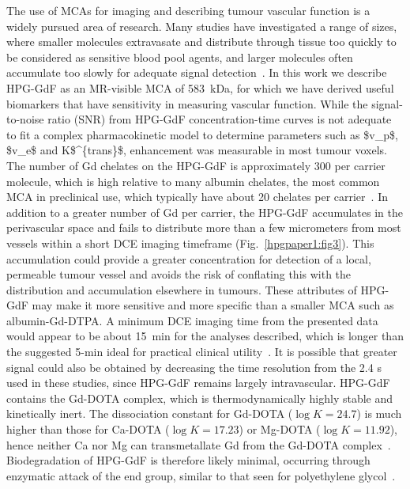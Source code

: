 The use of \acs{MCA}s for imaging and describing tumour vascular function is a widely pursued area of research.
Many studies have investigated a range of sizes, where smaller molecules extravasate and distribute through tissue too quickly to be considered as sensitive blood pool agents, and larger molecules often accumulate too slowly for adequate signal detection~\cite{Kyle:2007ch,Tang:2013fi,Sourbron:2011ce}.
In this work we describe \acs{HPG-GdF} as an MR-visible \acs{MCA} of 583~\acs{kDa}, for which we have derived useful biomarkers that have sensitivity in measuring vascular function.
While the signal-to-noise ratio (\acs{SNR}) from \acs{HPG-GdF} concentration-time curves is not adequate to fit a complex pharmacokinetic model to determine parameters such as \acs{$v_p$}, \acs{$v_e$} and \acs{K$^{trans}$}, enhancement was measurable in most tumour voxels.
The number of Gd chelates on the \acs{HPG-GdF} is approximately 300 per carrier molecule, which is high relative to many albumin chelates, the most common \acs{MCA} in preclinical use, which typically have about 20 chelates per carrier~\cite{Ogan:1987tg}.
In addition to a greater number of Gd per carrier, the \acs{HPG-GdF} accumulates in the perivascular space and fails to distribute more than a few micrometers from most vessels within a short DCE imaging timeframe (Fig.~\ref{hpgpaper1:fig3}).
This accumulation could provide a greater concentration for detection of a local, permeable tumour vessel and avoids the risk of conflating this with the distribution and accumulation elsewhere in tumours.
These attributes of \acs{HPG-GdF} may make it more sensitive and more specific than a smaller  \acs{MCA} such as albumin-Gd-DTPA.
A minimum DCE imaging time from the presented data would appear to be about 15~min for the analyses described, which is longer than the suggested 5-min ideal for practical clinical utility~\cite{Turetschek:2004bw}.
It is possible that greater signal could also be obtained by decreasing the time resolution from the 2.4 s used in these studies, since \acs{HPG-GdF} remains largely intravascular.
\acs{HPG-GdF} contains the Gd-\acs{DOTA} complex, which is thermodynamically highly  stable and kinetically inert.
The dissociation constant for Gd-\acs{DOTA} ($\log K = 24.7$) is much higher than those for Ca-\acs{DOTA} ($\log K = 17.23$) or Mg-\acs{DOTA} ($\log K = 11.92$), hence neither Ca nor Mg can transmetallate Gd from the Gd-\acs{DOTA} complex~\cite{Baranyai:2005ta}.
Biodegradation of \acs{HPG-GdF} is therefore likely minimal, occurring through enzymatic attack of the end group, similar to that seen for polyethylene glycol~\cite{Kawai:2002fc}.

